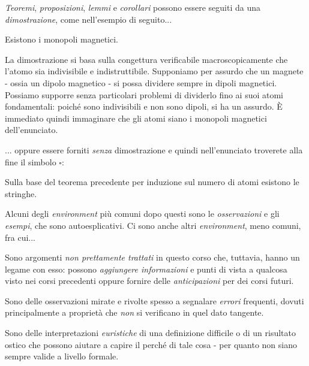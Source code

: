 \noindent\textit{Teoremi}, \textit{proposizioni}, \textit{lemmi} e \textit{corollari} possono essere seguiti da una \textit{dimostrazione}, come nell'esempio di seguito...
\begin{theoremanote}
	Esistono i monopoli magnetici.
\end{theoremanote}
\begin{demonstration}
	La dimostrazione si basa sulla congettura verificabile macroscopicamente che l'atomo sia indivisibile e indistruttibile. Supponiamo per assurdo che un magnete - ossia un dipolo magnetico - si possa dividere sempre in dipoli magnetici. Possiamo supporre senza particolari problemi di dividerlo fino ai suoi atomi fondamentali: poiché sono indivisibili e non sono dipoli, si ha un assurdo. È immediato quindi immaginare che gli atomi siano i monopoli magnetici dell'enunciato.
\end{demonstration}
... oppure essere forniti \textit{senza} dimostrazione e quindi nell'enunciato troverete alla fine il simbolo $\square$:
\begin{corollarynote}
	Sulla base del teorema precedente per induzione sul numero di atomi esistono le stringhe.
\end{corollarynote}
\noindent Alcuni degli \textit{environment} più comuni dopo questi sono le \textit{osservazioni} e gli \textit{esempi}, che sono autoesplicativi. Ci sono anche altri \textit{environment}, meno comuni, fra cui...
\begin{digression}
	Sono argomenti \textit{non prettamente trattati} in questo corso che, tuttavia, hanno un legame con esso: possono \textit{aggiungere informazioni} e punti di vista a qualcosa visto nei corsi precedenti oppure fornire delle \textit{anticipazioni} per dei corsi futuri.
\end{digression}
\begin{attention}
	Sono delle osservazioni mirate e rivolte spesso a segnalare \textit{errori} frequenti, dovuti principalmente a proprietà che \textit{non} si verificano in quel dato tangente. 
\end{attention}
\begin{intuit}
	Sono delle interpretazioni \textit{euristiche} di una definizione difficile o di un risultato ostico che possono aiutare a capire il perché di tale cosa - per quanto non siano sempre valide a livello formale. 
\end{intuit}
